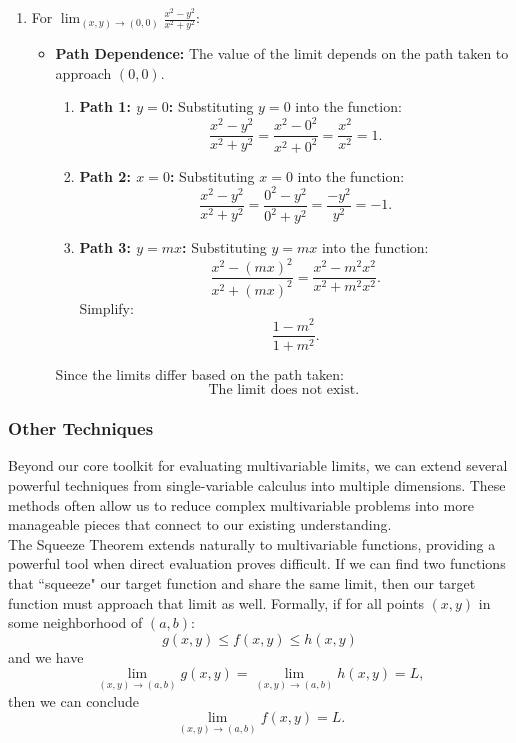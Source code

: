 \begin{example}
\begin{solution}
\begin{enumerate}
    \item For \( \lim_{(x, y) \to (0, 0)} \frac{x^2 - y^2}{x^2 + y^2} \):
    \begin{itemize}
        \item \textbf{Path Dependence:} The value of the limit depends on the path taken to approach \( (0, 0) \).
        \begin{enumerate}
            \item \textbf{Path 1: \( y = 0 \):} Substituting \( y = 0 \) into the function:
            \[
            \frac{x^2 - y^2}{x^2 + y^2} = \frac{x^2 - 0^2}{x^2 + 0^2} = \frac{x^2}{x^2} = 1.
            \]
            \item \textbf{Path 2: \( x = 0 \):} Substituting \( x = 0 \) into the function:
            \[
            \frac{x^2 - y^2}{x^2 + y^2} = \frac{0^2 - y^2}{0^2 + y^2} = \frac{-y^2}{y^2} = -1.
            \]
            \item \textbf{Path 3: \( y = mx \):} Substituting \( y = mx \) into the function:
            \[
            \frac{x^2 - (mx)^2}{x^2 + (mx)^2} = \frac{x^2 - m^2x^2}{x^2 + m^2x^2}.
            \]
            Simplify:
            \[
            \frac{1 - m^2}{1 + m^2}.
            \]
        \end{enumerate}
        Since the limits differ based on the path taken:
        \[
        \text{The limit does not exist.}
        \]
    \end{itemize}
\end{enumerate}
\end{solution}
\end{example}
\exampleline

\subsubsection*{Other Techniques}
Beyond our core toolkit for evaluating multivariable limits, we can extend several powerful techniques from single-variable calculus into multiple dimensions. These methods often allow us to reduce complex multivariable problems into more manageable pieces that connect to our existing understanding. \\

\noindent The Squeeze Theorem extends naturally to multivariable functions, providing a powerful tool when direct evaluation proves difficult. If we can find two functions that ``squeeze" our target function and share the same limit, then our target function must approach that limit as well. Formally, if for all points $(x,y)$ in some neighborhood of $(a,b)$:
\[
g(x, y) \leq f(x, y) \leq h(x, y)
\]
and we have
\[
\lim_{(x, y) \to (a, b)} g(x, y) = \lim_{(x, y) \to (a, b)} h(x, y) = L,
\]
then we can conclude
\[
\lim_{(x, y) \to (a, b)} f(x, y) = L.
\]

